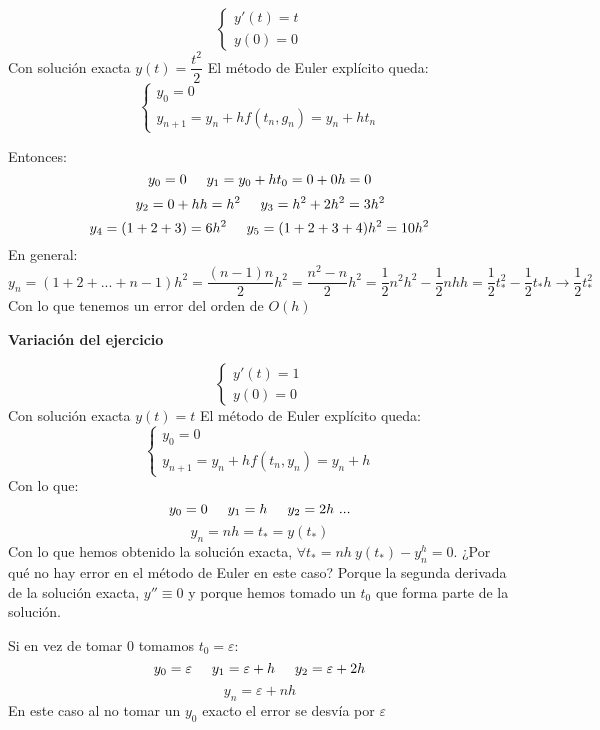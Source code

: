 \documentclass[openany]{book}
\begin{document}
    \setcounter{ex}{5}
    \begin{exercise}
        $$ \left\{
        \begin{array}{l}
            y'(t) = t\\
            y(0) = 0
        \end{array}
        \right. $$
        Con solución exacta $ y(t) = \dfrac{t^2}{2} $
        El método de Euler explícito queda:
        $$ \left\{
        \begin{array}{l}
            y_0 = 0\\
            y_{n+1} = y_n + hf(t_n,g_n) = y_n +ht_n 
        \end{array}
        \right. $$

        Entonces:
        $$ y_0 =0\hspace{5mm}y_1 = y_0 +ht_0 = 0+0h = 0 $$
        $$ y_2 = 0 + hh = h^2\hspace{5mm}y_3 = h^2+2h^2 = 3h^2 $$
        $$ y_4 = (1+2+3) = 6h^2 \hspace{5mm} y_5 = (1+2+3+4)h^2 = 10h^2  $$
        En general:
        $$ y_n = (1+2+...+n-1)h^2  = \dfrac{(n-1)n}{2}h^2 = \dfrac{n^2-n}{2}h^2 = \dfrac{1}{2}n^2h^2-\dfrac{1}{2}nhh = \dfrac{1}{2}t_{*}^2-\dfrac{1}{2}t_{*}h \to \dfrac{1}{2}t_{*}^2$$
        Con lo que tenemos un error del orden de $ O(h) $
        
        \begin{flushright}
            \textbf{Variación del ejercicio}
        \end{flushright}
        $$ \left\{
        \begin{array}{l}
            y'(t) = 1\\
            y(0) = 0
        \end{array}
        \right. $$
        Con solución exacta $ y(t) = t $
        El método de Euler explícito queda:
        $$ \left\{
        \begin{array}{l}
            y_0 = 0\\
            y_{n+1} = y_n +h f(t_n,y_n) = y_n+h
        \end{array}
        \right. $$
        Con lo que:
        $$ y_0 = 0 \hspace{5mm} y_1 = h \hspace{5mm} y_2 = 2h\ ... $$
        $$ y_n = nh = t_{*} = y(t_{*}) $$
        Con lo que hemos obtenido la solución exacta, $ \forall t_{*} = nh\ y(t_{*}) - y_n^{h} = 0 $.
        ¿Por qué no hay error en el método de Euler en este caso? Porque la segunda derivada de la solución exacta, $ y'' \equiv 0 $ y porque hemos tomado un $ t_0 $ que forma parte de la solución.

        Si en vez de tomar 0 tomamos $ t_0 = \varepsilon $:
        $$ y_0 = \varepsilon \hspace{5mm} y_1 = \varepsilon +h \hspace{5mm} y_2 = \varepsilon +2h $$
        $$ y_n = \varepsilon +nh $$
        En este caso al no tomar un $ y_0  $ exacto el error se desvía por $ \varepsilon $

    \end{exercise}
\end{document}
